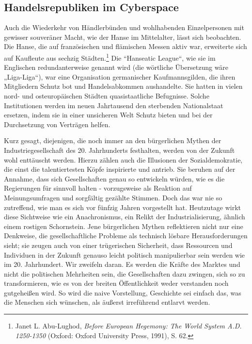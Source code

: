 \documentclass[
  a5paper,
  smalldemyvopaper,10pt,twoside,onecolumn,openright,extrafontsizes,hidelinks]{memoir}
\begin{document}
\subsection{Handelsrepubliken im
Cyberspace}\label{handelsrepubliken-im-cyberspace}

Auch die Wiederkehr von Händlerbünden und wohlhabenden Einzelpersonen
mit gewisser souveräner Macht, wie der Hanse im Mittelalter, lässt sich
beobachten. Die Hanse, die auf französischen und flämischen Messen aktiv
war, erweiterte sich auf Kaufleute aus sechzig Städten.\footnote{Janet
  L. Abu-Lughod, \emph{Before European Hegemony: The World System A.D.
  1250-1350} (Oxford: Oxford University Press, 1991), S. 62.} Die
``Hanseatic League``, wie sie im Englischen redundanterweise genannt
wird (die wörtliche Übersetzung wäre „Liga-Liga``), war eine
Organisation germanischer Kaufmannsgilden, die ihren Mitgliedern Schutz
bot und Handelsabkommen aushandelte. Sie hatten in vielen nord- und
osteuropäischen Städten quasistaatliche Befugnisse. Solche Institutionen
werden im neuen Jahrtausend den sterbenden Nationalstaat ersetzen, indem
sie in einer unsicheren Welt Schutz bieten und bei der Durchsetzung von
Verträgen helfen.

Kurz gesagt, diejenigen, die noch immer an den bürgerlichen Mythen der
Industriegesellschaft des 20. Jahrhunderts festhalten, werden von der
Zukunft wohl enttäuscht werden. Hierzu zählen auch die Illusionen der
Sozialdemokratie, die einst die talentiertesten Köpfe inspirierte und
antrieb. Sie beruhen auf der Annahme, dass sich Gesellschaften genau so
entwickeln würden, wie es die Regierungen für sinnvoll halten -
vorzugsweise als Reaktion auf Meinungsumfragen und sorgfältig gezählte
Stimmen. Doch das war nie so zutreffend, wie man es sich vor fünfzig
Jahren vorgestellt hat. Heutzutage wirkt diese Sichtweise wie ein
Anachronismus, ein Relikt der Industrialisierung, ähnlich einem rostigen
Schornstein. Jene bürgerlichen Mythen reflektieren nicht nur eine
Denkweise, die gesellschaftliche Probleme als technisch lösbare
Herausforderungen sieht; sie zeugen auch von einer trügerischen
Sicherheit, dass Ressourcen und Individuen in der Zukunft genauso leicht
politisch manipulierbar sein werden wie im 20. Jahrhundert. Wir zweifeln
daran. Es werden die Kräfte des Marktes und nicht die politischen
Mehrheiten sein, die Gesellschaften dazu zwingen, sich so zu
transformieren, wie es von der breiten Öffentlichkeit weder verstanden
noch gutgeheißen wird. So wird die naive Vorstellung, Geschichte sei
einfach das, was die Menschen sich wünschen, als äußerst irreführend
entlarvt werden.
\end{document}
